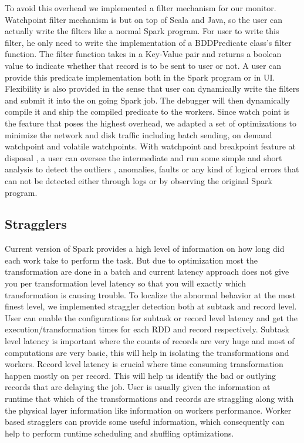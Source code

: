 \documentclass{acm_proc_article-sp}
\begin{document}
To avoid this overhead we implemented a filter mechanism for our monitor. Watchpoint filter mechanism is but on top of Scala and Java, so the user can actually write the filters like a normal Spark program.  For user to write this filter, he only need to write the implementation of a BDDPredicate class's filter function. The filter function takes in a Key-Value pair and returns a boolean value to indicate whether that record is to be sent to user or not. A user can provide this predicate implementation both in the Spark program or in UI.  Flexibility is also provided in the sense that user can dynamically write the filters and submit it into the on going Spark job. The debugger will then dynamically compile it and ship the compiled predicate to the workers. Since watch point is the feature that poses the highest overhead, we adapted a set of optimizations to minimize the network and disk traffic including batch sending, on demand watchpoint and volatile watchpoints. With watchpoint and breakpoint feature at disposal , a user can oversee the intermediate and run some simple and short analysis to detect the outliers , anomalies, faults or any kind of logical errors that can not be detected either through logs or by observing the original Spark program. 


 
\subsection{Stragglers}

Current version of Spark provides a high level of information on how long did each work take to perform the task. But due to optimization most the transformation are done in a batch and current latency approach does not give you per transformation level latency so that you will exactly which transformation is causing trouble. To localize the abnormal behavior at the most finest level, we implemented straggler detection both at subtask and record level. User can enable the configurations for subtask or record level latency and get the execution/transformation times for each RDD and record respectively. Subtask level latency is important where the counts of records are very huge and most of computations are very basic, this will help in isolating the transformations and workers. Record level latency is crucial where time consuming transformation happen mostly on per record. This will help us identify the bad or outlying records that are delaying the job. User is usually given the information at runtime that which of the transformations and records are straggling along with the physical layer information like information on workers performance. Worker based stragglers can provide some useful information, which consequently can help to perform runtime scheduling and shuffling optimizations.
\end{document}
